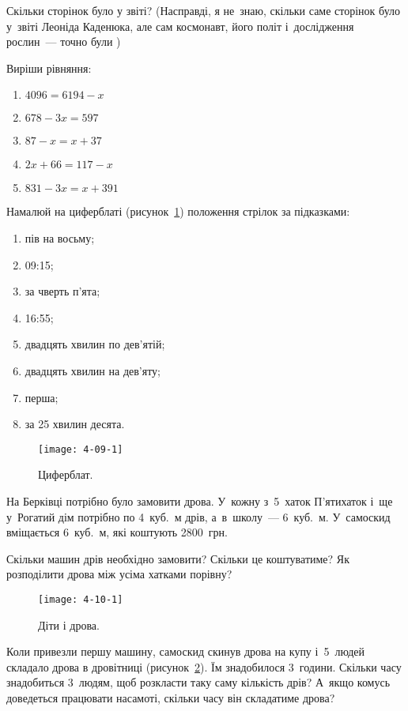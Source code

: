 Скільки сторінок було у звіті?
(Насправді, я не~знаю, скільки саме сторінок було у~звіті Леоніда Каденюка,
але сам космонавт, його політ і~дослідження рослин~--- точно були \smiley)


\problem
Виріши рівняння:
\begin{multicols}{2}
  \begin{enumerate}
    \item $4096 = 6194 - x$
    \item $678 - 3x = 597$
    \item $87 - x = x + 37$
    \item $2x + 66 = 117 - x$
    \item $831 - 3x = x + 391$
  \end{enumerate}
\end{multicols}


\problem
Намалюй на циферблаті (рисунок~\ref{fig:clockface-2})
положення стрілок за підказками:
\begin{enumerate}
  \item пів на восьму;
  \item 09:15;
  \item за чверть п’ята;
  \item 16:55;
  \item двадцять хвилин по дев’ятій;
  \item двадцять хвилин на дев’яту;
  \item перша;
  \item за 25 хвилин десята.
\end{enumerate}

\begin{figure}[ht]
  \centering
  \texttt{[image: 4-09-1]}
  \caption{Циферблат.}
  \label{fig:clockface-2}
\end{figure}


\problem
На Берківці потрібно було замовити дрова.
У~кожну з~5~хаток П'ятихаток і~ще у~Рогатий дім потрібно по 4~куб.~м дрів,
а~в~школу~--- 6~куб.~м.
У~самоскид вміщається 6~куб.~м, які коштують 2800~грн.

Скільки машин дрів необхідно замовити? Скільки це коштуватиме?
Як розподілити дрова між усіма хатками порівну?

\begin{figure}[ht]
  \centering
  \texttt{[image: 4-10-1]}
  \caption{Діти і дрова.}
  \label{fig:children-firewood}
\end{figure}

Коли привезли першу машину, самоскид скинув дрова на купу і~5~людей
складало дрова в дровітниці (рисунок~\ref{fig:children-firewood}).
Їм знадобилося 3~години.
Скільки часу знадобиться 3~людям, щоб розкласти таку саму кількість дрів?
А~якщо комусь доведеться працювати насамоті, скільки часу він складатиме дрова?


